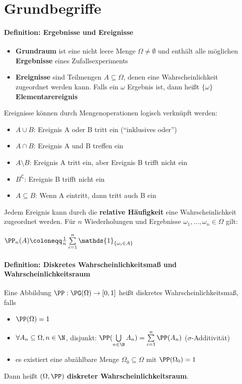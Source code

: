\section{Grundbegriffe}
\paragraph{Definition: Ergebnisse und Ereignisse}
\begin{itemize}
	\item \textbf{Grundraum} ist eine nicht leere Menge $\Omega\neq\emptyset$ und enthält alle möglichen \textbf{Ergebnisse} eines Zufallsexperiments
	\item \textbf{Ereignisse} sind Teilmengen $A\subseteq\Omega$, denen eine Wahrscheinlichkeit zugeordnet werden kann. 
	Falls ein $\omega$ Ergebnis ist, dann heißt $\{\omega\}$ \textbf{Elementarereignis}
\end{itemize}
Ereignisse können durch Mengenoperationen logisch verknüpft werden:
\begin{itemize}
	\item $A\cup B$: Ereignis A oder B tritt ein (\enquote{inklusives oder})
	\item $A\cap B$: Ereignis A und B treffen ein
	\item $A\setminus B$: Ereignis A tritt ein, aber Ereignis B trifft nicht ein
	\item $B^{\mathsf{C}}$: Ereignis B trifft nicht ein
	\item $A\subseteq B$: Wenn A eintritt, dann tritt auch B ein
\end{itemize}
Jedem Ereignis kann durch die \textbf{relative Häufigkeit} eine Wahrscheinlichkeit zugeordnet werden. 
Für $n$ Wiederholungen und Ergebnisse $\omega_1,\ldots,\omega_n\in\Omega$ gilt:
\begin{tightcenter}
	$\PP_n(A)\coloneqq\frac{1}{n}\sum\limits_{i=1}^{n} \mathds{1}_{\{\omega_i \in A\}}$
\end{tightcenter}

\paragraph{Definition: Diskretes Wahrscheinlichkeitsmaß und Wahrscheinlichkeitsraum}
Eine Abbildung $\PP:\PG(\Omega) \rightarrow [0,1]$ heißt diskretes Wahrscheinlichkeitsmaß, falls
\begin{itemize}
	\item $\PP(\Omega)=1$
	\item $\forall A_n \subseteq \Omega, n\in\N$, disjunkt: $\PP(\bigcup\limits_{n\in \N} A_n)=\sum\limits_{i=1}^{n} \PP(A_n)$ \qquad($\sigma$-Additivität)
	\item es existiert eine abzählbare Menge $\Omega_0\subseteq\Omega$ mit $\PP(\Omega_0)=1$
\end{itemize}
Dann heißt $(\Omega, \PP)$ \textbf{diskreter Wahrscheinlichkeitsraum}.

